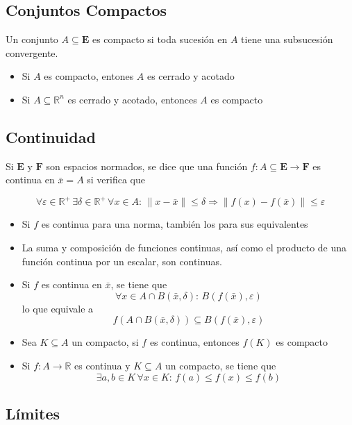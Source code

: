 \subsection{Conjuntos Compactos}

Un conjunto $A\subseteq\mathbf{E}$ es compacto si toda sucesión en $A$ tiene una subsucesión convergente.

\begin{itemize}
    \item Si $A$ es compacto, entones $A$ es cerrado y acotado
    \item Si $A\subseteq\mathbb{R}^n$ es cerrado y acotado, entonces $A$ es compacto
\end{itemize}

\subsection{Continuidad}

Si $\mathbf{E}$ y $\mathbf{F}$ son espacios normados, se dice que una función $f:A\subseteq\mathbf{E}\to\mathbf{F}$ es continua en $\bar{x}=A$ si verifica que

\[\forall\varepsilon\in\mathbb{R}^+\,\exists\delta\in
\mathbb{R}^+\,\forall x\in A:\, \|x-\bar{x}\|\leq \delta \Rightarrow \|f(x)-f(\bar{x})\|\leq \varepsilon\]

\begin{itemize}
    \item Si $f$ es continua para una norma, también los para sus equivalentes
    \item La suma y composición de funciones continuas, así como el producto de una función continua por un escalar, son continuas.
    \item Si $f$ es continua en $\bar{x}$, se tiene que
    \[\forall x\in A\cap B(\bar{x},\delta):\,B(f(\bar{x}),\varepsilon)\]
    lo que equivale a
    \[f(A\cap B(\bar{x}, \delta))\subseteq B(f(\bar{x}),\varepsilon)\]
    \item Sea $K\subseteq A$ un compacto, si $f$ es continua, entonces $f(K)$ es compacto
    \item Si $f:A\to\mathbb{R}$ es continua y $K\subseteq A$ un compacto, se tiene que
    \[\exists a,b\in K\,\forall x\in K:\, f(a)\leq f(x)
    \leq f(b)\]
\end{itemize}

\subsection{Límites}

